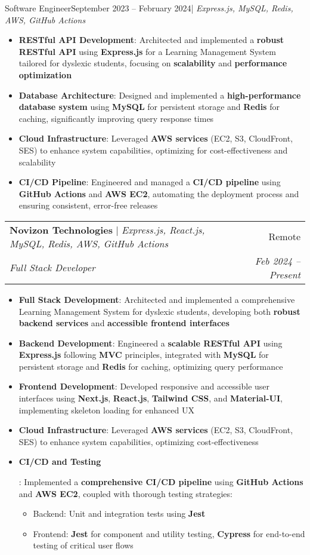 \documentclass[letterpaper,10pt]{article}
\makeatletter
\newcommand{\resumeItem}[2]{
  \item\small{
    \textbf{#1}{: #2 \vspace{-2pt}}
  }
}
\newcommand{\resumeSubheading}[5]{
  \vspace{-1pt}\item
    \begin{tabular*}{0.97\textwidth}{l@{\extracolsep{\fill}}r}
      \textbf{#1} #5 & #2 \\
      \textit{\small#3} & \textit{\small #4} \\
    \end{tabular*}\vspace{-5pt}
}
\newcommand{\resumeItemListStart}{\begin{itemize}}
\newcommand{\resumeItemListEnd}{\end{itemize}\vspace{-5pt}}
\makeatother
\begin{document}
{  {Software Engineer}{September 2023 -- February 2024}{| \textit{Express.js, MySQL, Redis, AWS, GitHub Actions}}
  \resumeItemListStart
    \resumeItem{RESTful API Development}
    {Architected and implemented a \textbf{robust RESTful API} using \textbf{Express.js} for a Learning Management System tailored for dyslexic students, focusing on \textbf{scalability} and \textbf{performance optimization}}
    \resumeItem{Database Architecture}
    {Designed and implemented a \textbf{high-performance database system} using \textbf{MySQL} for persistent storage and \textbf{Redis} for caching, significantly improving query response times}
    \resumeItem{Cloud Infrastructure}
    {Leveraged \textbf{AWS services} (EC2, S3, CloudFront, SES) to enhance system capabilities, optimizing for cost-effectiveness and scalability}
    \resumeItem{CI/CD Pipeline}
    {Engineered and managed a \textbf{CI/CD pipeline} using \textbf{GitHub Actions} and \textbf{AWS EC2}, automating the deployment process and ensuring consistent, error-free releases}
  \resumeItemListEnd
    
\resumeSubheading
  {Novizon Technologies}{Remote}
  {Full Stack Developer}{Feb 2024 -- Present}{| \textit{Express.js, React.js, MySQL, Redis, AWS, GitHub Actions}}
  \resumeItemListStart
    \resumeItem{Full Stack Development}
    {Architected and implemented a comprehensive Learning Management System for dyslexic students, developing both \textbf{robust backend services} and \textbf{accessible frontend interfaces}}
    \resumeItem{Backend Development}
    {Engineered a \textbf{scalable RESTful API} using \textbf{Express.js} following \textbf{MVC} principles, integrated with \textbf{MySQL} for persistent storage and \textbf{Redis} for caching, optimizing query performance}
    \resumeItem{Frontend Development}
    {Developed responsive and accessible user interfaces using \textbf{Next.js}, \textbf{React.js}, \textbf{Tailwind CSS}, and \textbf{Material-UI}, implementing skeleton loading for enhanced UX}
    \resumeItem{Cloud Infrastructure}
    {Leveraged \textbf{AWS services} (EC2, S3, CloudFront, SES) to enhance system capabilities, optimizing cost-effectiveness}
    \resumeItem{CI/CD and Testing}
    {Implemented a \textbf{comprehensive CI/CD pipeline} using \textbf{GitHub Actions} and \textbf{AWS EC2}, coupled with thorough testing strategies:
    \begin{itemize}
      \item Backend: Unit and integration tests using \textbf{Jest}
      \item Frontend: \textbf{Jest} for component and utility testing, \textbf{Cypress} for end-to-end testing of critical user flows
    \end{itemize}}
  \resumeItemListEnd
 
}
\end{document}
